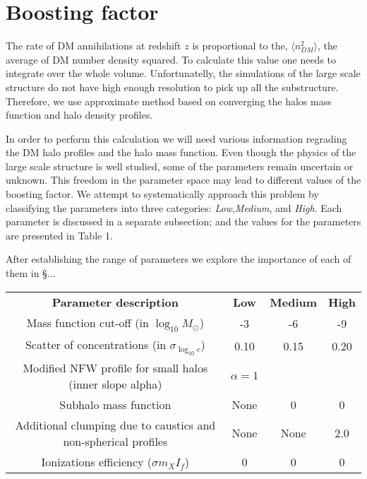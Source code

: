\section{Boosting factor}
\label{sec:boosting}

The rate of DM annihilations at redshift $z$ is proportional to the, $\langle n_{DM}^2 \rangle$, the average of DM number density squared. To calculate this value one needs to integrate over the whole volume. Unfortunatelly, the simulations of the large scale structure do not have high enough resolution to pick up all the substructure. Therefore, we use approximate method based on converging the halos mass function and halo density profiles.

In order to perform this calculation we will need various information regrading the DM halo profiles and the halo mass function. Even though the physics of the large scale structure is well studied, some of the parameters remain uncertain or unknown. This freedom in the parameter space may lead to different values of the boosting factor. We attempt to systematically approach this problem by classifying the parameters into three categories: \textit{Low},\textit{Medium}, and \textit{High}. Each parameter is discussed in a separate subsection; and the values for the parameters are presented in Table 1.

After establishing the range of parameters we explore the importance of each of them in \S ... 

\begin{table}
    \begin{tabular}{ c c c c }
    \textbf{Parameter description}                                    & \textbf{Low} & \textbf{Medium} & \textbf{High} \hline \hline \\
    Mass function cut-off (in $\log_{10}M_\odot$)        & -3 & -6 & -9 \\
    Scatter of concentrations (in $\sigma_{\log_{10}c}$)              & 0.10 & 0.15 & 0.20 \\
    Modified NFW profile for small halos (inner slope alpha) & $\alpha=1$ & \cite{Ishiyama_2014} &  \cite{Ishiyama_2014} \\
    Subhalo mass function & None & 0 & 0 \\
    Additional clumping due to caustics and non-spherical profiles & None & None & 2.0
\\    
    Ionizations efficiency ($\sigma m_X I_f$) & 0 & 0 & 0
\\    \end{tabular}
\end{table}
